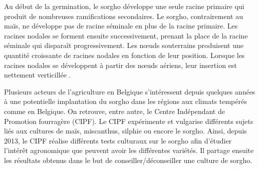Au début de la germination, le sorgho développe une seule racine primaire qui produit de nombreuses ramifications secondaires.
Le sorgho, contrairement au maïs, ne développe pas de racine séminale en plus de la racine primaire.
Les racines nodales se forment ensuite successivement, prenant la place de la racine séminale qui disparaît progressivement.
Les nœuds souterrains produisent une quantité croissante de racines nodales en fonction de leur position.
Lorsque les racines nodales se développent à partir des nœuds aériens, leur insertion est nettement verticillée \citep{kumar_goyal_how_2021}.
\newline

Plusieurs acteurs de l'agriculture en Belgique s'intéressent depuis quelques années à une potentielle implantation du sorgho dans les régions aux climats tempérés comme en Belgique.
On retrouve, entre autre, le Centre Indépendant de Promotion fourragère (CIPF).
Le CIPF expérimente et vulgarise différents sujets liés aux cultures de maïs, miscanthus, silphie ou encore le sorgho.
Ainsi, depuis 2013, le CIPF réalise différents tests culturaux sur le sorgho afin d'étudier l'intérêt agronomique que peuvent avoir les différentes variétés.
Il partage ensuite les résultats obtenus dans le but de conseiller/déconseiller une culture de sorgho.